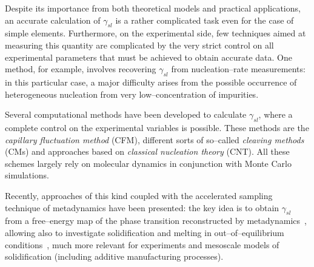 Despite its importance from both theoretical models and practical applications, an accurate calculation of $\gamma_{sl}$ is a rather complicated task even for the case of simple elements. Furthermore, on the experimental side, few techniques aimed at measuring this quantity are complicated by the very strict control on all experimental parameters that must be achieved to obtain accurate data. One method, for example, involves recovering $\gamma_{sl}$ from nucleation--rate measurements: in this particular case, a major difficulty arises from the possible occurrence of heterogeneous nucleation from very low--concentration of impurities.

Several computational methods have been developed to calculate $\gamma_{sl}$, where a complete control on the experimental variables is possible. These methods are the \emph{capillary fluctuation method} (CFM), different sorts of so--called \emph{cleaving methods} (CMs) and approaches based on \emph{classical nucleation theory} (CNT). All these schemes largely rely on molecular dynamics in conjunction with Monte Carlo simulations.

Recently, approaches of this kind coupled with the accelerated sampling technique of metadynamics have been presented: the key idea is to obtain $\gamma_{sl}$ from a free--energy map of the phase transition reconstructed by metadynamics~\cite{Angioletti-Uberti2010}, allowing also to investigate solidification and melting in out--of--equilibrium conditions~\cite{Cheng2015}, much more relevant for experiments and mesoscale models of solidification (including additive manufacturing processes).



